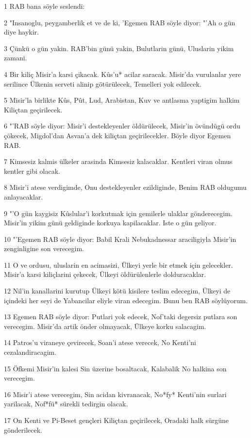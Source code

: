 \par 1 RAB bana söyle seslendi:
\par 2 "Insanoglu, peygamberlik et ve de ki, 'Egemen RAB söyle diyor: "'Ah o gün diye haykir.
\par 3 Çünkü o gün yakin. RAB'bin günü yakin, Bulutlarin günü, Uluslarin yikim zamani.
\par 4 Bir kiliç Misir'a karsi çikacak. Kûs'u* acilar saracak. Misir'da vurulanlar yere serilince Ülkenin serveti alinip götürülecek, Temelleri yok edilecek.
\par 5 Misir'la birlikte Kûs, Pût, Lud, Arabistan, Kuv ve antlasma yaptigim halkim Kiliçtan geçirilecek.
\par 6 "'RAB söyle diyor: Misir'i destekleyenler öldürülecek, Misir'in övündügü ordu çökecek, Migdol'dan Asvan'a dek kiliçtan geçirilecekler. Böyle diyor Egemen RAB.
\par 7 Kimsesiz kalmis ülkeler arasinda Kimsesiz kalacaklar. Kentleri viran olmus kentler gibi olacak.
\par 8 Misir'i atese verdigimde, Onu destekleyenler ezildiginde, Benim RAB oldugumu anlayacaklar.
\par 9 "'O gün kaygisiz Kûslular'i korkutmak için gemilerle ulaklar gönderecegim. Misir'in yikim günü geldiginde korkuya kapilacaklar. Iste o gün geliyor.
\par 10 "'Egemen RAB söyle diyor: Babil Krali Nebukadnessar araciligiyla Misir'in zenginligine son verecegim.
\par 11 O ve ordusu, uluslarin en acimasizi, Ülkeyi yerle bir etmek için gelecekler. Misir'a karsi kiliçlarini çekecek, Ülkeyi öldürülenlerle dolduracaklar.
\par 12 Nil'in kanallarini kurutup Ülkeyi kötü kisilere teslim edecegim, Ülkeyi de içindeki her seyi de Yabancilar eliyle viran edecegim. Bunu ben RAB söylüyorum.
\par 13 Egemen RAB söyle diyor: Putlari yok edecek, Nof'taki degersiz putlara son verecegim. Misir'da artik önder olmayacak, Ülkeye korku salacagim.
\par 14 Patros'u viraneye çevirecek, Soan'i atese verecek, No Kenti'ni cezalandiracagim.
\par 15 Öfkemi Misir'in kalesi Sin üzerine bosaltacak, Kalabalik No halkina son verecegim.
\par 16 Misir'i atese verecegim, Sin acidan kivranacak, No*fy* Kenti'nin surlari yarilacak, Nof*fü* sürekli tedirgin olacak.
\par 17 On Kenti ve Pi-Beset gençleri Kiliçtan geçirilecek, Oradaki halk sürgüne gönderilecek.

